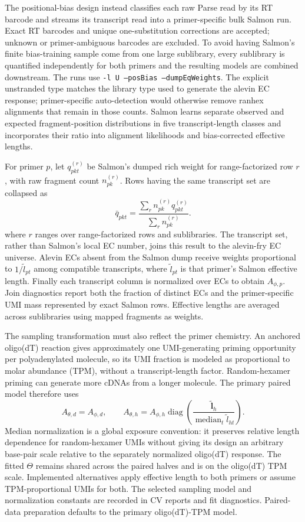 \documentclass[11pt]{article}
\begin{document}
The positional-bias design instead classifies each raw Parse read by its RT
barcode and streams its transcript read into a primer-specific bulk Salmon
run. Exact RT barcodes and unique one-substitution corrections are accepted;
unknown or primer-ambiguous barcodes are excluded. To avoid having Salmon's
finite bias-training sample come from one large sublibrary, every sublibrary
is quantified independently for both primers and the resulting models are
combined downstream. The runs use
\texttt{-l U --posBias --dumpEqWeights}. The explicit unstranded type matches
the library type used to generate the alevin EC response; primer-specific
auto-detection would otherwise remove ranhex alignments that remain in those
counts. Salmon learns separate observed and expected fragment-position
distributions in five transcript-length classes and incorporates their ratio
into alignment likelihoods and bias-corrected effective lengths.

For primer \(p\), let \(q^{(r)}_{pkt}\) be Salmon's dumped rich weight for
range-factorized row \(r\), with raw fragment count \(n^{(r)}_{pk}\).
Rows having the same transcript set are collapsed as
\[
  \bar q_{pkt} =
  \frac{\sum_r n^{(r)}_{pk}q^{(r)}_{pkt}}
       {\sum_r n^{(r)}_{pk}}.
\]
where \(r\) ranges over range-factorized rows and sublibraries.
The transcript set, rather than Salmon's local EC number, joins this result to
the alevin-fry EC universe. Alevin ECs absent from the Salmon dump receive
weights proportional to \(1/\tilde l_{pt}\) among compatible transcripts,
where \(\tilde l_{pt}\) is that primer's Salmon effective length. Finally each
transcript column is normalized over ECs to obtain \(A_{\phi,p}\). Join
diagnostics report both the fraction of distinct ECs and the primer-specific
UMI mass represented by exact Salmon rows. Effective lengths are averaged
across sublibraries using mapped fragments as weights.

The sampling transformation must also reflect the primer chemistry. An
anchored oligo(dT) reaction gives approximately one UMI-generating priming
opportunity per polyadenylated molecule, so its UMI fraction is modeled as
proportional to molar abundance (TPM), without a transcript-length factor.
Random-hexamer priming can generate more cDNAs from a longer molecule. The
primary paired model therefore uses
\[
  A_{\theta,d}=A_{\phi,d},\qquad
  A_{\theta,h}=A_{\phi,h}
  \operatorname{diag}\left(
    \frac{\tilde{\bm l}_h}
         {\operatorname{median}_t\tilde l_{ht}}
  \right).
\]
Median normalization is a global exposure convention: it preserves relative
length dependence for random-hexamer UMIs without giving its design an
arbitrary base-pair scale relative to the separately normalized oligo(dT)
response. The fitted \(\Theta\) remains shared across the paired halves and is
on the oligo(dT) TPM scale. Implemented alternatives apply effective length to
both primers or assume TPM-proportional UMIs for both. The selected sampling
model and normalization constants are recorded in CV reports and fit
diagnostics. Paired-data preparation defaults to the primary oligo(dT)-TPM
model.
\end{document}
